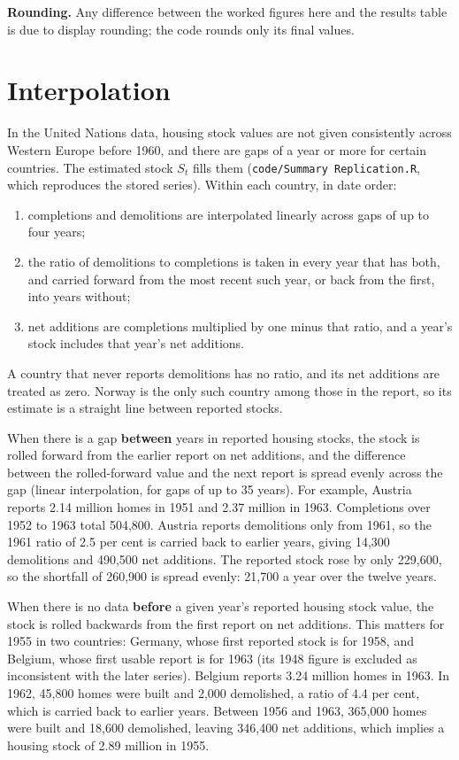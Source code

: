\documentclass[11pt,a4paper]{article}
\newcommand{\code}[1]{\texttt{#1}}
\begin{document}
\textbf{Rounding.} Any difference between the worked figures here and the results table is
due to display rounding; the code rounds only its final values.

\section*{Interpolation}

In the United Nations data, housing stock values are not given consistently across
Western Europe before 1960, and there are gaps of a year or more for certain countries.
The estimated stock $S_t$ fills them (\code{code/Summary Replication.R}, which reproduces
the stored series). Within each country, in date order:
\begin{enumerate}
  \item completions and demolitions are interpolated linearly across gaps of up to four
        years;
  \item the ratio of demolitions to completions is taken in every year that has both, and
        carried forward from the most recent such year, or back from the first, into years
        without;
  \item net additions are completions multiplied by one minus that ratio, and a year's
        stock includes that year's net additions.
\end{enumerate}
A country that never reports demolitions has no ratio, and its net additions are treated
as zero. Norway is the only such country among those in the report, so its estimate is a
straight line between reported stocks.

When there is a gap \textbf{between} years in reported housing stocks, the stock is rolled
forward from the earlier report on net additions, and the difference between the
rolled-forward value and the next report is spread evenly across the gap (linear
interpolation, for gaps of up to 35 years). For example, Austria reports 2.14 million
homes in 1951 and 2.37 million in 1963. Completions over 1952 to 1963 total 504,800.
Austria reports demolitions only from 1961, so the 1961 ratio of 2.5 per cent is carried
back to earlier years, giving 14,300 demolitions and 490,500 net additions. The reported
stock rose by only 229,600, so the shortfall of 260,900 is spread evenly: 21,700 a year
over the twelve years.

When there is no data \textbf{before} a given year's reported housing stock value, the
stock is rolled backwards from the first report on net additions. This matters for 1955
in two countries: Germany, whose first reported stock is for 1958, and Belgium, whose
first usable report is for 1963 (its 1948 figure is excluded as inconsistent with the
later series). Belgium reports 3.24 million homes in 1963. In 1962, 45,800 homes were
built and 2,000 demolished, a ratio of 4.4 per cent, which is carried back to earlier
years. Between 1956 and 1963, 365,000 homes were built and 18,600 demolished, leaving
346,400 net additions, which implies a housing stock of 2.89 million in 1955.
\end{document}

